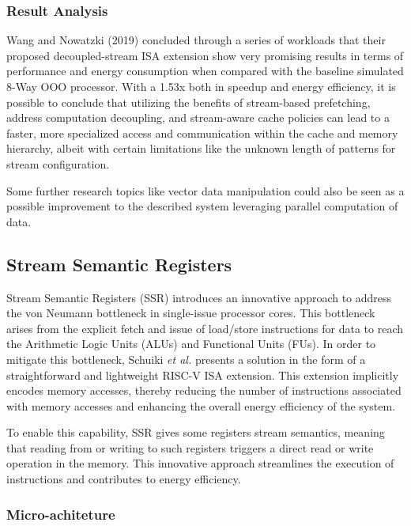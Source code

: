 \subsubsection{Result Analysis}

Wang and Nowatzki (2019) \cite{8980305} concluded through a series of workloads that their proposed decoupled-stream ISA extension show very promising results in terms of performance and energy consumption when compared with the baseline simulated 8-Way OOO processor. 
With a 1.53x both in speedup and energy efficiency, it is possible to conclude that utilizing the benefits of stream-based prefetching, address computation decoupling, and stream-aware cache policies can lead to a faster, more specialized access and communication within the cache and memory hierarchy, albeit with certain limitations like the unknown length of patterns for stream configuration.

Some further research topics like vector data manipulation could also be seen as a possible improvement to the described system leveraging parallel computation of data.

\subsection{Stream Semantic Registers}
\label{label:ssr}

Stream Semantic Registers (SSR) \cite{9068465} introduces an innovative approach to address the von Neumann bottleneck in single-issue processor cores. This bottleneck arises from the explicit fetch and issue of load/store instructions for data to reach the Arithmetic Logic Units (ALUs) and Functional Units (FUs). In order to mitigate this bottleneck, Schuiki \textit{et al.} \cite{9068465} presents a solution in the form of a straightforward and lightweight RISC-V ISA extension. This extension implicitly encodes memory accesses, thereby reducing the number of instructions associated with memory accesses and enhancing the overall energy efficiency of the system.

To enable this capability, SSR gives some registers stream semantics, meaning that reading from or writing to such registers triggers a direct read or write operation in the memory. This innovative approach streamlines the execution of instructions and contributes to energy efficiency.

\subsubsection{Micro-achiteture}

